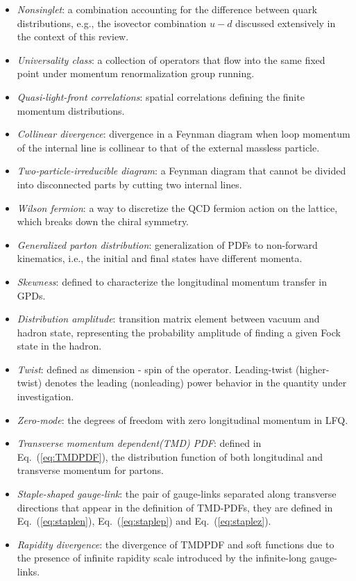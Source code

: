 \documentclass[aps,rmp,reprint,amsmath,amssymb,graphicx,longbibliography]{revtex4-1} %
\begin{document}
\begin{itemize}
\item[] {\it Nonsinglet}: a combination accounting for the difference between quark distributions, e.g., the isovector combination $u-d$ discussed extensively in the context of this review.
\item[] {\it Universality class}: a collection of operators that flow into the same fixed point under momentum renormalization group running.
\item[] {\it Quasi-light-front correlations}: spatial correlations defining the finite momentum distributions.
\item[] {\it Collinear divergence}: divergence in a Feynman diagram when loop momentum of the internal line is collinear to that of the external massless particle.
\item[] {\it Two-particle-irreducible diagram}: a Feynman diagram that cannot be divided into disconnected parts by cutting two internal lines.
\item[] {\it Wilson fermion}: a way to discretize the QCD fermion action on the lattice, which breaks down the chiral symmetry.
\item[] {\it Generalized parton distribution}: generalization of PDFs to non-forward kinematics, i.e., the initial and final states have different momenta.
\item[] {\it Skewness}: defined to characterize the longitudinal momentum transfer in GPDs.
\item[] {\it Distribution amplitude}: transition matrix element between vacuum and hadron state, representing the probability amplitude of finding a given Fock state in the hadron.
\item[] {\it Twist}: defined as dimension - spin of the operator. Leading-twist (higher-twist) denotes the leading (nonleading) power behavior in the quantity under investigation.
\item[] {\it Zero-mode}: the degrees of freedom with zero longitudinal momentum in LFQ.
\item[] {\it Transverse momentum dependent(TMD) PDF}: defined in Eq.~(\ref{eq:TMDPDF}), the distribution function of both longitudinal and transverse momentum for partons.
\item[] {\it Staple-shaped gauge-link}: the pair of gauge-links separated along transverse directions that appear in the definition of TMD-PDFs, they are defined in Eq.~(\ref{eq:staplen}), Eq.~(\ref{eq:staplep}) and Eq.~(\ref{eq:staplez}).
\item[] {\it Rapidity divergence}: the divergence of TMDPDF and soft functions due to the presence of infinite rapidity scale introduced by the infinite-long gauge-links.

\end{itemize}
\end{document}
